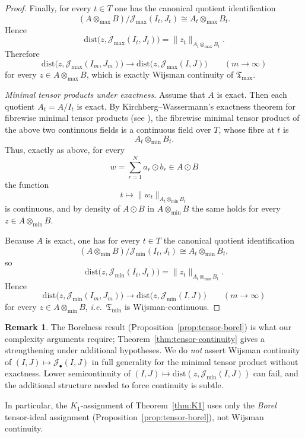 \documentclass[12pt,fleqn,a4paper]{amsart}
\numberwithin{equation}{section}
\theoremstyle{definition}
\newtheorem{remark}[theorem]{Remark}
\newcommand{\dist}{\mathrm{dist}}
\begin{document}
\begin{proof}
Finally, for every $t\in T$ one has the canonical quotient identification
\[
(A\otimes_{\max} B)/\mathcal J_{\max}(I_t,J_t)
\cong
A_t\otimes_{\max} B_t.
\]
Hence
\[
\dist\bigl(z,\mathcal J_{\max}(I_t,J_t)\bigr)
=
\|z_t\|_{A_t\otimes_{\max} B_t}.
\]
Therefore
\[
\dist\bigl(z,\mathcal J_{\max}(I_m,J_m)\bigr)
\longrightarrow
\dist\bigl(z,\mathcal J_{\max}(I,J)\bigr)
\qquad (m\to\infty)
\]
for every $z\in A\otimes_{\max} B$, which is exactly Wijsman continuity of
$\mathfrak T_{\max}$.

\smallskip
\noindent\emph{Minimal tensor products under exactness.}
Assume that $A$ is exact.
Then each quotient $A_t=A/I_t$ is exact.
By Kirchberg--Wassermann's exactness theorem for fibrewise minimal tensor products
(see \cite[Thm.~4.5]{KirchbergWassermann1995}), the fibrewise minimal tensor product
of the above two continuous fields is a continuous field over $T$, whose fibre at $t$ is
\[
A_t\otimes_{\min} B_t.
\]
Thus, exactly as above, for every
\[
w=\sum_{r=1}^{N} a_r\odot b_r\in A\odot B
\]
the function
\[
t\longmapsto \|w_t\|_{A_t\otimes_{\min} B_t}
\]
is continuous, and by density of $A\odot B$ in $A\otimes_{\min} B$ the same holds for every
$z\in A\otimes_{\min} B$.

Because $A$ is exact, one has for every $t\in T$ the canonical quotient identification
\[
(A\otimes_{\min} B)/\mathcal J_{\min}(I_t,J_t)
\cong
A_t\otimes_{\min} B_t,
\]
so
\[
\dist\bigl(z,\mathcal J_{\min}(I_t,J_t)\bigr)
=
\|z_t\|_{A_t\otimes_{\min} B_t}.
\]
Hence
\[
\dist\bigl(z,\mathcal J_{\min}(I_m,J_m)\bigr)
\longrightarrow
\dist\bigl(z,\mathcal J_{\min}(I,J)\bigr)
\qquad (m\to\infty)
\]
for every $z\in A\otimes_{\min} B$, \emph{i.e.}\ $\mathfrak T_{\min}$ is Wijsman-continuous.
\end{proof}

\begin{remark}\label{rem:tensor-cont}
The Borelness result (Proposition~\ref{prop:tensor-borel}) is what our complexity
arguments require; Theorem~\ref{thm:tensor-continuity} gives a strengthening under
additional hypotheses.  We do \emph{not} assert Wijsman continuity of
$(I,J)\mapsto\mathcal J_\bullet(I,J)$ in full generality for the minimal tensor
product without exactness.  Lower semicontinuity of
$(I,J)\mapsto\dist(z,\mathcal J_{\min}(I,J))$ can fail, and the additional
structure needed to force continuity is subtle.

In particular, the $K_1$-assignment of Theorem~\ref{thm:K1} uses only the
\emph{Borel} tensor-ideal assignment (Proposition~\ref{prop:tensor-borel}), not
Wijsman continuity.
\end{remark}
\end{document}
